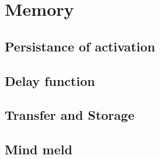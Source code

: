 \chapter{Memory}
\section{Persistance of activation}
\section{Delay function}
\section{Transfer and Storage}
\section{Mind meld}
